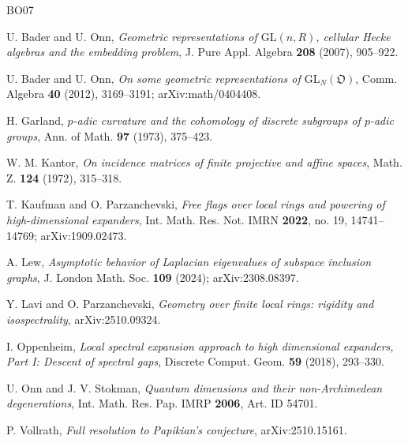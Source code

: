 \documentclass[11pt]{article}
\numberwithin{equation}{section}
\theoremstyle{plain}
\theoremstyle{definition}
\begin{document}
\begin{thebibliography}{BO07}

 U. Bader and U. Onn, \emph{Geometric representations of $\mathrm{GL}(n,R)$, cellular
Hecke algebras and the embedding problem}, J. Pure Appl. Algebra \textbf{208} (2007),
905--922.

 U. Bader and U. Onn, \emph{On some geometric representations of
$\mathrm{GL}_N(\mathfrak{O})$}, Comm. Algebra \textbf{40} (2012), 3169--3191;
arXiv:math/0404408.

 H. Garland, \emph{$p$-adic curvature and the cohomology of discrete subgroups of
$p$-adic groups}, Ann. of Math. \textbf{97} (1973), 375--423.

 W. M. Kantor, \emph{On incidence matrices of finite projective and affine spaces},
Math. Z. \textbf{124} (1972), 315--318.

 T. Kaufman and O. Parzanchevski, \emph{Free flags over local rings and powering of
high-dimensional expanders}, Int. Math. Res. Not. IMRN \textbf{2022}, no. 19, 14741--14769;
arXiv:1909.02473.

 A. Lew, \emph{Asymptotic behavior of Laplacian eigenvalues of subspace inclusion
graphs}, J. London Math. Soc. \textbf{109} (2024); arXiv:2308.08397.

 Y. Lavi and O. Parzanchevski, \emph{Geometry over finite local rings: rigidity and
isospectrality}, arXiv:2510.09324.

 I. Oppenheim, \emph{Local spectral expansion approach to high dimensional
expanders, Part I: Descent of spectral gaps}, Discrete Comput. Geom. \textbf{59} (2018),
293--330.

 U. Onn and J. V. Stokman, \emph{Quantum dimensions and their non-Archimedean
degenerations}, Int. Math. Res. Pap. IMRP \textbf{2006}, Art. ID 54701.

 P. Vollrath, \emph{Full resolution to Papikian's conjecture}, arXiv:2510.15161.

\end{thebibliography}
\end{document}
